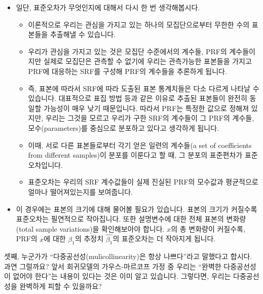 \documentclass[
]{book}
\begin{document}
\begin{itemize}
\item
  일단, 표준오차가 무엇인지에 대해서 다시 한 번 생각해봅시다.

  \begin{itemize}
  \item
    이론적으로 우리는 관심을 가지고 있는 하나의 모집단으로부터 무한한 수의 표본들을 추출해낼 수 있습니다.
  \item
    우리가 관심을 가지고 있는 것은 모집단 수준에서의 계수들, PRF의 계수들이지만 실제로 모집단은 관측할 수 없기에 우리는 관측가능한 표본들을 가지고 PRF에 대응하는 SRF를 구성해 PRF의 계수들을 추론하게 됩니다.
  \item
    즉, 표본에 따라서 SRF에 따라 도출된 표본 통계치들은 다소 다르게 나타날 수 있습니다. 대표적으로 표집 방법 등과 같은 이유로 추출된 표본들이 완전히 동일할 가능성이 매우 낮기 때문입니다. 따라서 PRF는 특정한 값으로 정해져 있지만, 우리는 그것을 모르고 우리가 구한 SRF의 계수들이 그 PRF의 계수들, 모수(parameters)를 중심으로 분포하고 있다고 생각하게 됩니다.
  \item
    이때, 서로 다른 표본들로부터 각기 얻은 일련의 계수들(a set of coefficients from different samples)이 분포를 이룬다고 할 때, 그 분포의 표준편차가 표준오차입니다.
  \item
    표준오차는 우리의 SRF 계수값들이 실제 진실된 PRF의 모수값과 평균적으로 얼마나 떨어져있는지를 보여줍니다.
  \end{itemize}
\item
  이 경우에는 표본의 크기에 대해 물어볼 필요가 있습니다. 표본의 크기가 커질수록 표준오차는 필연적으로 작아집니다. 또한 설명변수에 대한 전체 표본의 변화량(total sample variations)을 확인해보아야 합니다. \(x\)의 총 변화량이 커질수록, PRF의 \(x\)에 대한 \(\beta_1\)의 추정치 \(\hat{\beta_1}\)의 표준오차는 더 작아지게 됩니다.
\end{itemize}

셋째, 누군가가 ``다중공선성(mulicollinearity)은 항상 나쁘다''라고 말했다고 합시다. 과연 그럴까요? 앞서 회귀모델의 가우스-마르코프 가정 중 우리는 ``완벽한 다중공선성이 없어야 한다''는 내용이 있다는 것은 이미 알고 있습니다. 그렇다면, 우리는 다중공선성을 완벽하게 피할 수 있을까요?
\end{document}
